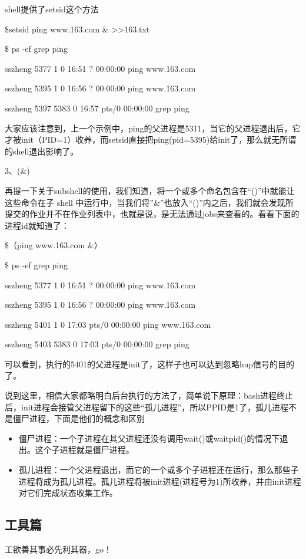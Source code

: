 \documentclass[letterpaper,10pt]{sphinxmanual}
\begin{document}
shell提供了setsid这个方法

\$setsid ping www.163.com \& \textgreater{}\textgreater{}163.txt

\$ ps -ef {\color{red}\bfseries{}\textbar{}}grep ping

sszheng   5377     1 0 16:51 ?        00:00:00 ping www.163.com

sszheng   5395     1 0 16:56 ?        00:00:00 ping www.163.com

sszheng   5397 5383 0 16:57 pts/0    00:00:00 grep ping

大家应该注意到，上一个示例中，ping的父进程是5311，当它的父进程退出后，它才被init（PID=1）收养，而setsid直接把ping(pid=5395)给init了，那么就无所谓的shell退出影响了。

3、(\&)

再提一下关于subshell的使用，我们知道，将一个或多个命名包含在“()”中就能让这些命令在子 shell 中运行中，当我们将''\&''也放入“()”内之后，我们就会发现所提交的作业并不在作业列表中，也就是说，是无法通过jobs来查看的。看看下面的进程id就知道了：

\$（ping www.163.com \&）

\$ ps -ef {\color{red}\bfseries{}\textbar{}}grep ping

sszheng   5377     1 0 16:51 ?        00:00:00 ping www.163.com

sszheng   5395     1 0 16:56 ?        00:00:00 ping www.163.com

sszheng   5401     1 0 17:03 pts/0    00:00:00 ping www.163.com

sszheng   5403 5383 0 17:03 pts/0    00:00:00 grep ping

可以看到，执行的5401的父进程是init了，这样子也可以达到忽略hup信号的目的了。

说到这里，相信大家都略明白后台执行的方法了，简单说下原理：bash进程终止后，init进程会接管父进程留下的这些“孤儿进程”，所以PPID是1了，孤儿进程不是僵尸进程，下面是他们的概念和区别
\begin{itemize}
\item {} 
僵尸进程：一个子进程在其父进程还没有调用wait()或waitpid()的情况下退出。这个子进程就是僵尸进程。

\item {} 
孤儿进程：一个父进程退出，而它的一个或多个子进程还在运行，那么那些子进程将成为孤儿进程。孤儿进程将被init进程(进程号为1)所收养，并由init进程对它们完成状态收集工作。

\end{itemize}


\subsection{工具篇}
\label{Linux_pro_mana/tools::doc}\label{Linux_pro_mana/tools:id1}
工欲善其事必先利其器，go！
\end{document}
